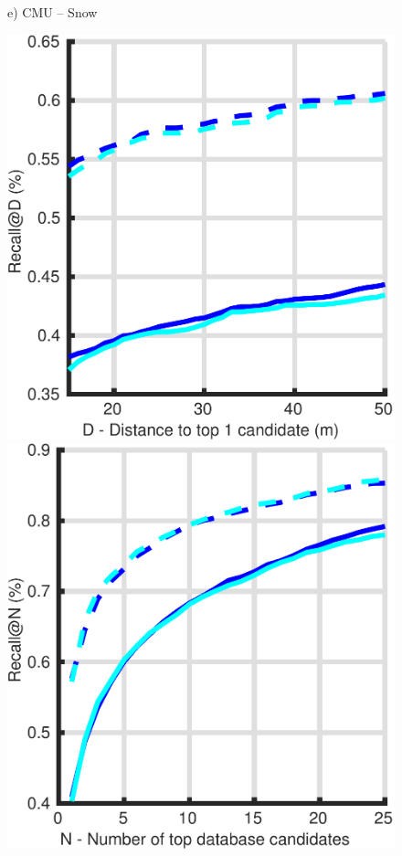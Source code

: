 \begin{figure}
\begin{minipage}{0.16\linewidth}
		e) CMU -- Snow
	\end{minipage}
	\begin{minipage}{0.16\linewidth}
		\center \scriptsize
		\includegraphics[width=\linewidth]{plot/night_ft/Results_cmu_autumn/distance}	
		
		\includegraphics[width=\linewidth]{plot/night_ft/Results_cmu_autumn/recall}
		

\end{minipage}
\end{figure}
